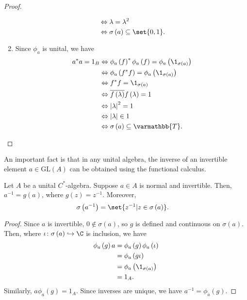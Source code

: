 \documentclass[10pt]{mypackage}
\renewcommand*{\mathbb}[1]{\varmathbb{#1}}
\newcommand{\T}{\mathbb{T}}
\newcommand{\GL}{\text{GL}}
\begin{document}
\begin{proof}
\begin{enumerate}[(1)]
\begin{align*}
                &\Leftrightarrow \lambda = \lambda^2\\
                &\Leftrightarrow \sigma\left(a\right)\subseteq \set{0,1}.
      \end{align*}
    \item Since $\phi_a$ is unital, we have
      \begin{align*}
        a^{\ast}a = 1_{B} &\Leftrightarrow \phi_a\left(f\right)^{\ast}\phi_a\left(f\right) = \phi_a\left(\1_{\sigma\left(a\right)}\right)\\
                          &\Leftrightarrow \phi_a\left(f^{\ast}f\right) = \phi_a\left(\1_{\sigma\left(a\right)}\right)\\
                          &\Leftrightarrow f^{\ast}f = \1_{\sigma\left(a\right)}\\
                          &\Leftrightarrow \overline{f\left(\lambda\right)}f\left(\lambda\right) = 1\\
                          &\Leftrightarrow \left\vert \lambda \right\vert^2 =1\\
                          &\Leftrightarrow \left\vert \lambda \right\vert\in 1\\
                          &\Leftrightarrow \sigma\left(a\right) \subseteq \T.
      \end{align*}
  \end{enumerate}
\end{proof}
An important fact is that in any unital algebra, the inverse of an invertible element $a\in \GL\left(A\right)$ can be obtained using the functional calculus.
\begin{fact}
  Let $A$ be a unital $C^{\ast}$-algebra. Suppose $a\in A$ is normal and invertible. Then, $a^{-1} = g(a)$, where $g(z) = z^{-1}$. Moreover,
  \begin{align*}
    \sigma\left(a^{-1}\right) &= \set{z^{-1} | z\in\sigma\left(a\right)}.
  \end{align*}
\end{fact}
\begin{proof}
  Since $a$ is invertible, $0\notin \sigma\left(a\right)$, so $g$ is defined and continuous on $\sigma\left(a\right)$. Then, where $\iota\colon \sigma\left(a\right)\hookrightarrow \C$ is inclusion, we have
  \begin{align*}
    \phi_a\left(g\right)a &= \phi_a\left(g\right)\phi_a\left(\iota\right)\\
                          &= \phi_a\left(g\iota\right)\\
                          &= \phi_a\left(\1_{\sigma\left(a\right)}\right)\\
                          &= 1_A.
  \end{align*}
  Similarly, $a\phi_a\left(g\right) = 1_A$. Since inverses are unique, we have $a^{-1} = \phi_a\left(g\right)$.
\end{proof}
\end{document}
